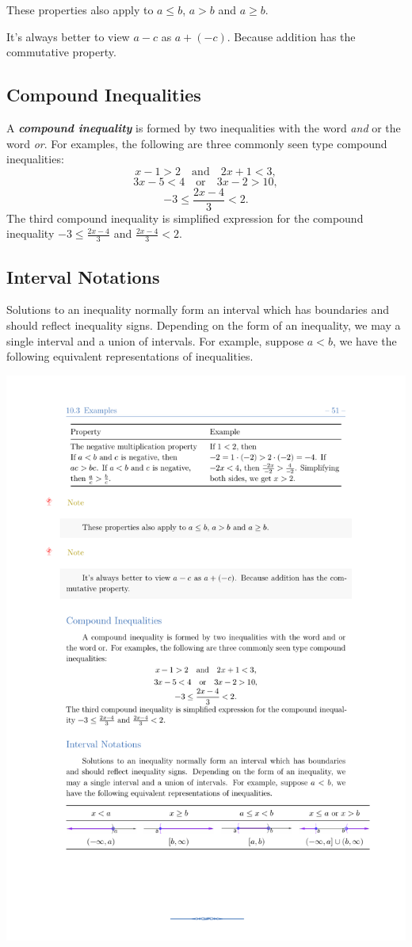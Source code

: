 \documentclass[
  en,11pt]{elegantbook}
\newcommand{\size}[2]{{\fontsize{#1}{0}\selectfont#2}}
\newenvironment{rmdnote}{
	\vspace*{0.5\baselineskip}
    \par\noindent
    \makebox[-3pt][r]{\color{red!90}\size{8}{\textdbend}\,\,}
    \begin{tcolorbox}[
    title={\textbf{\color{second}Note}},
    title style={left color=blue!10!green!20!white,right color=yellow!20!blue!20!white},
    colback=red!10!white,
    ]
    \itshape
}{
    \end{tcolorbox}
    \par\ignorespacesafterend
}
\begin{document}
\begin{rmdnote}

These properties also apply to \(a\leq b\), \(a>b\) and \(a\geq b\).

It's always better to view \(a-c\) as \(a+(-c)\). Because addition has the commutative property.

\end{rmdnote}

\hypertarget{compound-inequalities}{%
\subsection*{Compound Inequalities}\label{compound-inequalities}}

A \textbf{\emph{compound inequality}} is formed by two inequalities with the word \emph{and} or the word \emph{or}. For examples, the following are three commonly seen type compound inequalities:
\[
x-1>2\quad \text{and} \quad 2x+1<3,
\]
\[
3x-5<4\quad \text{or} \quad 3x-2>10,
\]
\[
-3\leq \frac{2x-4}{3}<2.
\]
The third compound inequality is simplified expression for the compound inequality \(-3\leq \frac{2x-4}{3}\) and \(\frac{2x-4}{3}<2\).

\hypertarget{interval-notations}{%
\subsection*{Interval Notations}\label{interval-notations}}

Solutions to an inequality normally form an interval which has boundaries and should reflect inequality signs. Depending on the form of an inequality, we may a single interval and a union of intervals. For example, suppose \(a<b\), we have the following equivalent representations of inequalities.

\begin{center}\includegraphics[width=0.5\linewidth]{figs/linear-inequalities} \end{center}
\end{document}
